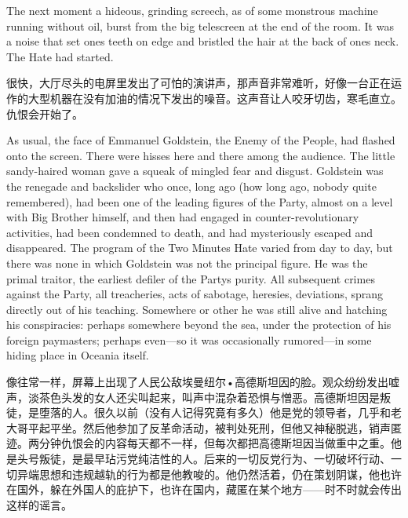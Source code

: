 \begin{paracol}{2}
\switchcolumn*

The next moment a hideous, grinding screech, as of some monstrous
machine running without oil, burst from the big telescreen at the end of
the room. It was a noise that set one\textquotesingle s teeth on edge
and bristled the hair at the back of one\textquotesingle s neck. The
Hate had started.

\switchcolumn

很快，大厅尽头的电屏里发出了可怕的演讲声，那声音非常难听，好像一台正在运作的大型机器在没有加油的情况下发出的噪音。这声音让人咬牙切齿，寒毛直立。仇恨会开始了。

\switchcolumn*

As usual, the face of Emmanuel Goldstein, the Enemy of the People, had
flashed onto the screen. There were hisses here and there among the
audience. The little sandy-haired woman gave a squeak of mingled fear
and disgust. Goldstein was the renegade and backslider who once, long
ago (how long ago, nobody quite remembered), had been one of the leading
figures of the Party, almost on a level with Big Brother himself, and
then had engaged in counter-revolutionary activities, had been condemned
to death, and had mysteriously escaped and disappeared. The program of
the Two Minutes Hate varied from day to day, but there was none in which
Goldstein was not the principal figure. He was the primal traitor, the
earliest defiler of the Party\textquotesingle s purity. All subsequent
crimes against the Party, all treacheries, acts of sabotage, heresies,
deviations, sprang directly out of his teaching. Somewhere or other he
was still alive and hatching his conspiracies: perhaps somewhere beyond
the sea, under the protection of his foreign paymasters; perhaps
even---so it was occasionally rumored---in some hiding place in Oceania
itself.

\switchcolumn

像往常一样，屏幕上出现了人民公敌埃曼纽尔•高德斯坦因的脸。观众纷纷发出嘘声，淡茶色头发的女人还尖叫起来，叫声中混杂着恐惧与憎恶。高德斯坦因是叛徒，是堕落的人。很久以前（没有人记得究竟有多久）他是党的领导者，几乎和老大哥平起平坐。然后他参加了反革命活动，被判处死刑，但他又神秘脱逃，销声匿迹。两分钟仇恨会的内容每天都不一样，但每次都把高德斯坦因当做重中之重。他是头号叛徒，是最早玷污党纯洁性的人。后来的一切反党行为、一切破坏行动、一切异端思想和违规越轨的行为都是他教唆的。他仍然活着，仍在策划阴谋，他也许在国外，躲在外国人的庇护下，也许在国内，藏匿在某个地方——时不时就会传出这样的谣言。

\switchcolumn*


\end{paracol}

